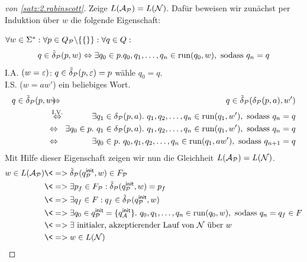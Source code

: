 \begin{proof}[von \autoref{satz:2.rabinscott}]
        Zeige $L(\mathcal{A}_{\mathcal{P}})=L(\mathcal{N})$. 
        Dafür beweisen wir zunächst per Induktion über  $w$ die folgende Eigenschaft:
        
        $\forall w\in\Sigma^*: \forall p\in Q_{\mathcal{P}}\backslash\{\{\}\}: \forall q\in Q:$
        $$q\in\tilde\delta_{\mathcal{P}}(p,w) \Leftrightarrow \exists q_0 \in p. {q_0, q_1,\ldots, q_n} \in \operatorname{run} (q_0, w), \text{ sodass } q_n=q$$
        I.A. $(w=\varepsilon)$: $q\in\tilde\delta_{\mathcal{P}}(p,\varepsilon) = p$ wähle
        $q_0 = q$.\\
        I.S. ($w=aw'$) ein beliebiges Wort.
        \begin{eqnarray*}
                q\in\tilde\delta_\calP(p,w)
                \hspace*{-2.5mm} & \Leftrightarrow & \hspace*{-2.5mm} q\in\tilde\delta_\calP(\delta_\calP(p,a),w')\\
                & \stackrel{\text{I.V.}}{\Leftrightarrow} & \hspace*{-2.5mm} \exists q_1 \in \delta_\calP(p,a). \  {q_1,q_2,\ldots, q_n}\in \Run(q_1,w'), \text{ sodass } q_n=q\\
                & {\Leftrightarrow} & \hspace*{-2.5mm} \exists q_0 \in p. \  q_1 \in \delta_\calP(p,a). \  {q_1,q_2,\ldots, q_n}\in \Run(q_1,w'), \text{ sodass } q_n=q\\
                & {\Leftrightarrow} & \hspace*{-2.5mm} \exists q_0 \in p. \   {q_0,q_1,q_2,\ldots, q_n}\in \Run(q_1,aw'), \text{ sodass } q_{n+1}=q\\
        \end{eqnarray*}
        Mit Hilfe dieser Eigenschaft zeigen wir nun die Gleichheit $L(\mathcal{A}_{\mathcal{P}})=L(\mathcal{N})$.
        \begin{align*}
         w\in L(\A_\calP) 
         &\<=> \tilde\delta_\calP(\qinit_\calP,w)\in F_\calP\\
         &\<=> \exists p_f\in F_\calP : \tilde\delta_\calP(\qinit_\calP,w) = p_f\\
         &\<=> \exists q_f\in F : q_f \in \tilde\delta_\calP(\qinit_\calP,w) \\
         &\<=> \exists q_0 \in \qinit_\calP = \{ \qinit_\A \}. \  {q_0, q_1,\ldots, q_n} \in \Run(q_0, w), \text{ sodass } q_n = q_f \in F\\
         &\<=> \exists \text{ initialer, akzeptierender Lauf von $\calN$ über $w$} \\
         &\<=> w\in L(\calN)
         \qedhere
        \end{align*}
\end{proof}

